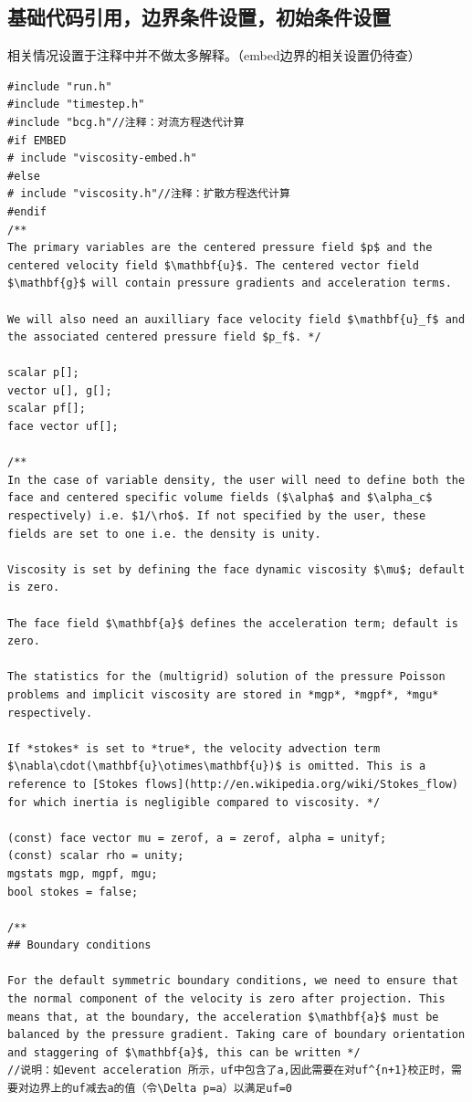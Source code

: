 \documentclass[lang=cn,11pt,a4paper]{elegantpaper}
\begin{document}
\subsection{基础代码引用，边界条件设置，初始条件设置}\label{sec:fundemantel}
相关情况设置于注释中并不做太多解释。（embed边界的相关设置仍待查）
\begin{verbatim}
#include "run.h"
#include "timestep.h"
#include "bcg.h"//注释：对流方程迭代计算
#if EMBED
# include "viscosity-embed.h"
#else
# include "viscosity.h"//注释：扩散方程迭代计算
#endif
/**
The primary variables are the centered pressure field $p$ and the
centered velocity field $\mathbf{u}$. The centered vector field
$\mathbf{g}$ will contain pressure gradients and acceleration terms.

We will also need an auxilliary face velocity field $\mathbf{u}_f$ and
the associated centered pressure field $p_f$. */

scalar p[];
vector u[], g[];
scalar pf[];
face vector uf[];

/**
In the case of variable density, the user will need to define both the
face and centered specific volume fields ($\alpha$ and $\alpha_c$
respectively) i.e. $1/\rho$. If not specified by the user, these
fields are set to one i.e. the density is unity.

Viscosity is set by defining the face dynamic viscosity $\mu$; default
is zero.

The face field $\mathbf{a}$ defines the acceleration term; default is
zero.

The statistics for the (multigrid) solution of the pressure Poisson
problems and implicit viscosity are stored in *mgp*, *mgpf*, *mgu* 
respectively. 

If *stokes* is set to *true*, the velocity advection term
$\nabla\cdot(\mathbf{u}\otimes\mathbf{u})$ is omitted. This is a
reference to [Stokes flows](http://en.wikipedia.org/wiki/Stokes_flow)
for which inertia is negligible compared to viscosity. */

(const) face vector mu = zerof, a = zerof, alpha = unityf;
(const) scalar rho = unity;
mgstats mgp, mgpf, mgu;
bool stokes = false;

/**
## Boundary conditions

For the default symmetric boundary conditions, we need to ensure that
the normal component of the velocity is zero after projection. This
means that, at the boundary, the acceleration $\mathbf{a}$ must be
balanced by the pressure gradient. Taking care of boundary orientation
and staggering of $\mathbf{a}$, this can be written */
//说明：如event acceleration 所示，uf中包含了a,因此需要在对uf^{n+1}校正时，需要对边界上的uf减去a的值（令\Delta p=a）以满足uf=0


\end{verbatim}
\end{document}
